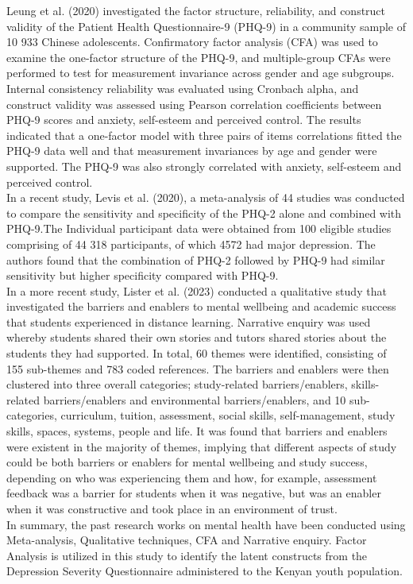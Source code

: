 \documentclass[12pt]{article}
\numberwithin{equation}{section}
\begin{document}
\noindent Leung et al. (2020) investigated the factor structure, reliability, and construct validity of the Patient Health Questionnaire-9 (PHQ-9) in a community sample of 10 933 Chinese adolescents. Confirmatory factor analysis (CFA) was used to examine the one-factor structure of the PHQ-9, and multiple-group CFAs were performed to test for measurement invariance across gender and age subgroups. Internal consistency reliability was evaluated using Cronbach alpha, and construct validity was assessed using Pearson correlation coefficients between PHQ-9 scores and anxiety, self-esteem and perceived control. The results indicated that a one-factor model with three pairs of items correlations fitted the PHQ-9 data well and that measurement invariances by age and gender were supported. The PHQ-9 was also strongly correlated with anxiety, self-esteem and perceived control.\\
\noindent In a recent study, Levis et al. (2020), a meta-analysis of 44 studies was conducted to compare the sensitivity and specificity of the PHQ-2 alone and combined with PHQ-9.The Individual participant data were obtained from 100 eligible studies comprising of 44 318 participants, of which 4572 had major depression. The authors found that the combination of PHQ-2 followed by PHQ-9 had similar sensitivity but higher specificity compared with PHQ-9.\\
\noindent In a more recent study, Lister et al. (2023) conducted a qualitative study that investigated the barriers and enablers to mental wellbeing and academic success that students experienced in distance learning. Narrative enquiry was used whereby students shared their own stories and tutors shared stories about the students they had supported. In total, 60 themes were identified, consisting of 155 sub-themes and 783 coded references. The barriers and enablers were then clustered into three overall categories; study-related barriers/enablers, skills-related barriers/enablers and environmental barriers/enablers, and 10 sub-categories, curriculum, tuition, assessment, social skills, self-management, study skills, spaces, systems, people and life. It was found that barriers and enablers were existent in the majority of themes, implying that different aspects of study could be both barriers or enablers for mental wellbeing and study success, depending on who was experiencing them and how, for example, assessment feedback was a barrier for students when it was negative, but was an enabler when it was constructive and took place in an environment of trust.\\
\noindent In summary, the past research works on mental health have been conducted using Meta-analysis, Qualitative techniques, CFA and Narrative enquiry. Factor Analysis is utilized in this study to identify the latent constructs from the Depression Severity Questionnaire administered to the Kenyan youth population.\\
\newpage
\end{document}
